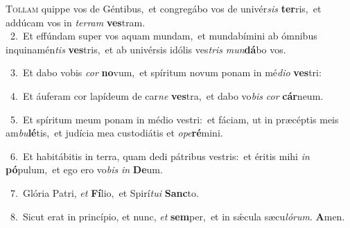 \lettrine{\initial\textcolor{\initialcolor}{T}}{ollam} quippe vos de Géntibus,~\dagger et congregábo vos de univér\textit{sis} \textbf{ter}\-ris,~\star et addúcam vos in \textit{ter}\-\textit{ram} \textbf{ves}\-tram.\\
{\numbfont\textcolor{\numbcolor}{~2.}}~Et effúndam super vos aquam mundam,~\dagger et mundabímini ab ómnibus inquinamén\textit{tis} \textbf{ves}\-tris,~\star et ab univérsis idólis ves\textit{tris} \textit{mun}\-\textbf{dá}bo vos.\par
{\numbfont\textcolor{\numbcolor}{~3.}}~Et dabo vobis \textit{cor} \textbf{no}\-vum,~\star et spíritum novum ponam in mé\-\textit{di}\-\textit{o} \textbf{ves}\-tri:\par
{\numbfont\textcolor{\numbcolor}{~4.}}~Et áuferam cor lapídeum de car\textit{ne} \textbf{ves}\-tra,~\star et dabo vo\textit{bis} \textit{cor} \textbf{cár}\-neum.\par
{\numbfont\textcolor{\numbcolor}{~5.}}~Et spíritum meum ponam in médio vestri:~\dagger et fáciam, ut in præcéptis meis am\-\textit{bu}\-\textbf{lé}tis,~\star et judícia mea custodiátis et \textit{o}\-\textit{pe}\textbf{ré}mini.\par
{\numbfont\textcolor{\numbcolor}{~6.}}~Et habitábitis in terra, quam dedi pátribus vestris:~\dagger et éritis mihi \textit{in} \textbf{pó}\-pulum,~\star et ego ero vo\textit{bis} \textit{in} \textbf{De}\-um.\par
{\numbfont\textcolor{\numbcolor}{~7.}}~Glória Patri, \textit{et} \textbf{Fí}\-lio,~\star et Spirí\-\textit{tu}\-\textit{i} \textbf{Sanc}\-to.\par
{\numbfont\textcolor{\numbcolor}{~8.}}~Sicut erat in princípio, et nunc, \textit{et} \textbf{sem}\-per,~\star et in sǽcula sæcu\-\textit{ló}\-\textit{rum}. \textbf{A}\-men.\par
